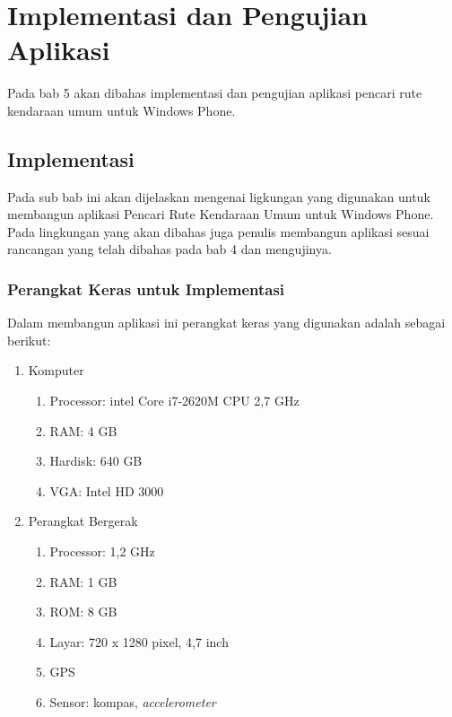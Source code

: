 \chapter{Implementasi dan Pengujian Aplikasi}
\label{chap:Implementasi dan Pengujian Aplikasi}

Pada bab 5 akan dibahas implementasi dan pengujian aplikasi pencari rute kendaraan umum untuk Windows Phone.

\section{Implementasi}
\label{lab:Implementasi}
\hspace{0.5cm} Pada sub bab ini akan dijelaskan mengenai ligkungan yang digunakan untuk membangun aplikasi Pencari Rute Kendaraan Umum untuk Windows Phone. Pada lingkungan yang akan dibahas juga penulis membangun aplikasi sesuai rancangan yang telah dibahas pada bab 4 dan mengujinya.

\subsection{Perangkat Keras untuk Implementasi}
\label{lab:Perangkat Keras untuk Implementasi}
\hspace{0.5cm} Dalam membangun aplikasi ini perangkat keras yang digunakan adalah sebagai berikut:
\begin{enumerate}
	\item Komputer
		\begin{enumerate}
			\item Processor: intel Core i7-2620M CPU 2,7 GHz
			\item RAM: 4 GB
			\item Hardisk: 640 GB
			\item VGA: Intel HD 3000
		\end{enumerate}
		
	\item Perangkat Bergerak
		\begin{enumerate}
			\item Processor: 1,2 GHz
			\item RAM: 1 GB
			\item ROM: 8 GB
			\item Layar: 720 x 1280 pixel, 4,7 inch
			\item GPS
			\item Sensor: kompas, \textit{accelerometer}
		\end{enumerate}
\end{enumerate}

